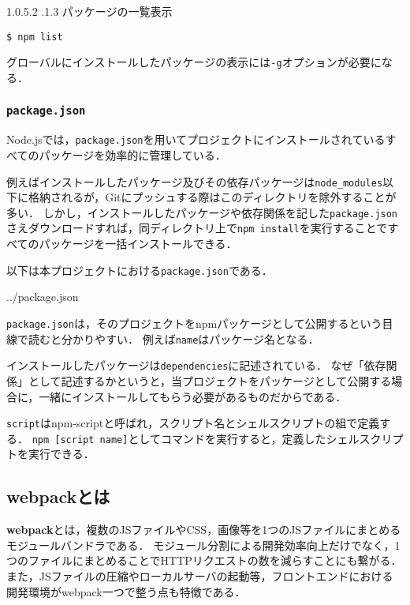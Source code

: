 \documentclass[autodetect-engine,dvi=dvipdfmx,ja=standard,
               a4j,11pt]{bxjsarticle}
\makeatletter
\renewcommand{\paragraph}{\@startsection{paragraph}{4}{\z@}%
  {1.0\Cvs \@plus.5\Cdp \@minus.2\Cdp}%
  {.1\Cvs \@plus.3\Cdp}%
  {\reset@font\sffamily\normalsize}
}
\makeatother
\begin{document}
\paragraph{パッケージの一覧表示}

\begin{Verbatim}[numbers=none, xleftmargin=8mm, numbersep=6pt, fontsize=\small, baselinestretch=0.8]
$ npm list
\end{Verbatim}
%
グローバルにインストールしたパッケージの表示には\verb|-g|オプションが必要になる．

\subsubsection{{\tt package.json}}

Node.jsでは，\verb|package.json|を用いてプロジェクトにインストールされているすべてのパッケージを効率的に管理している．

例えばインストールしたパッケージ及びその依存パッケージは\verb|node_modules|以下に格納されるが，Gitにプッシュする際はこのディレクトリを除外することが多い．
しかし，インストールしたパッケージや依存関係を記した\verb|package.json|さえダウンロードすれば，同ディレクトリ上で\verb|npm install|を実行することですべてのパッケージを一括インストールできる．

以下は本プロジェクトにおける\verb|package.json|である．

\begin{VerbatimInput}[numbers=left, xleftmargin=8mm, numbersep=6pt, fontsize=\small, baselinestretch=0.8]
{../package.json}
\end{VerbatimInput}

\verb|package.json|は，そのプロジェクトをnpmパッケージとして公開するという目線で読むと分かりやすい．
例えば\verb|name|はパッケージ名となる．

インストールしたパッケージは\verb|dependencies|に記述されている．
なぜ「依存関係」として記述するかというと，当プロジェクトをパッケージとして公開する場合に，一緒にインストールしてもらう必要があるものだからである．

\verb|script|はnpm-scriptと呼ばれ，スクリプト名とシェルスクリプトの組で定義する．
\verb|npm [script name]|としてコマンドを実行すると，定義したシェルスクリプトを実行できる．

\subsection{webpackとは}

{\bf webpack}とは，複数のJSファイルやCSS，画像等を1つのJSファイルにまとめるモジュールバンドラである．
モジュール分割による開発効率向上だけでなく，1つのファイルにまとめることでHTTPリクエストの数を減らすことにも繋がる．
また，JSファイルの圧縮やローカルサーバの起動等，フロントエンドにおける開発環境がwebpack一つで整う点も特徴である．
\end{document}
